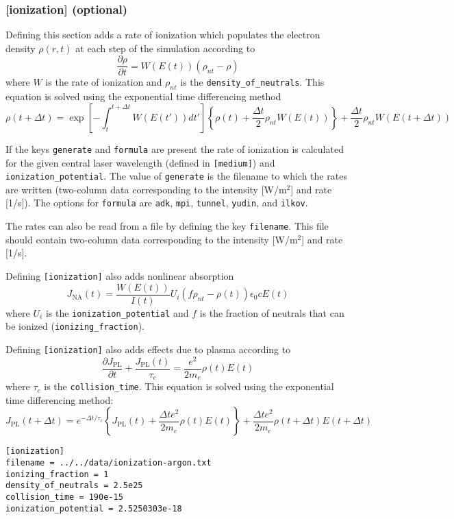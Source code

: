 \documentclass{article}
\begin{document}
\subsubsection{[ionization] (optional)}
Defining this section adds a rate of ionization which populates the
electron density $\rho(r,t)$ at each step of the simulation according to
\[\frac{\partial \rho}{\partial t} = W(E(t)) (\rho_{nt}-\rho)\]
where $W$ is the rate of ionization and $\rho_{nt}$ is the
\texttt{density\_of\_neutrals}.  This equation is solved using the
exponential time differencing method
\[\rho(t+\Delta t) = \exp\left[-\int_t^{t+\Delta t} W(E(t')) dt'\right]\left\{\rho(t) + \frac{\Delta t}{2} \rho_{nt}W(E(t))\right\} + \frac{\Delta t}{2} \rho_{nt} W(E(t+\Delta t))\]

If the keys \texttt{generate} and \texttt{formula} are present the
rate of ionization is calculated for the given central laser
wavelength (defined in \texttt{[medium]}) and
\texttt{ionization\_potential}. The value of \texttt{generate} is the
filename to which the rates are written (two-column data corresponding
to the intensity [W/m$^2$] and rate [1/s]). The options for
\texttt{formula} are \texttt{adk}, \texttt{mpi}, \texttt{tunnel},
\texttt{yudin}, and \texttt{ilkov}.

The rates can also be read from a file by defining the key
\texttt{filename}. This file should contain two-column data
corresponding to the intensity [W/m$^2$] and rate [1/s].

Defining \texttt{[ionization]} also adds nonlinear absorption
\[J_{\mathrm{NA}}(t) = \frac{W(E(t))}{I(t)} U_i \left(f\rho_{nt} -
    \rho(t)\right) \epsilon_0 c E(t)\] where $U_i$ is the
\texttt{ionization\_potential} and $f$ is the fraction of neutrals
that can be ionized (\texttt{ionizing\_fraction}).

Defining \texttt{[ionization]} also adds effects due to plasma according to
\[\frac{\partial J_{\mathrm{PL}}}{\partial t} + \frac{J_{\mathrm{PL}}(t)}{\tau_c} = \frac{e^2}{2 m_e} \rho(t) E(t)\]
where $\tau_c$ is the \texttt{collision\_time}. This equation is
solved using the exponential time differencing method:
\[J_{\mathrm{PL}}(t+\Delta t) = e^{-\Delta t/\tau_c}\left\{J_{\mathrm{PL}}(t) + \frac{\Delta t e^2}{2 m_e}\rho(t)E(t)\right\} + \frac{\Delta t e^2}{2 m_e} \rho(t+\Delta t) E(t+\Delta t)\]

\begin{lstlisting}
[ionization]
filename = ../../data/ionization-argon.txt
ionizing_fraction = 1
density_of_neutrals = 2.5e25
collision_time = 190e-15
ionization_potential = 2.5250303e-18
\end{lstlisting}
\end{document}
